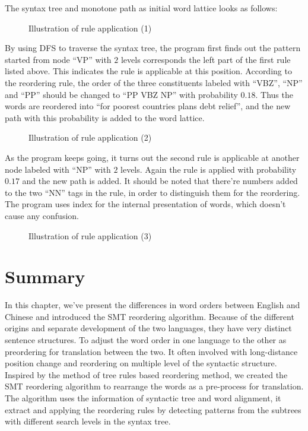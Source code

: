 The syntax tree and monotone path as initial word lattice looks as follows:
\begin{figure}[H]
\centering
\subfigure{

}
\subfigure{

}
\caption{Illustration of rule application (1)}
\end{figure}

By using DFS to traverse the syntax tree, the program first finds out the pattern started from node ``VP'' with $2$ levels corresponds the left part of the first rule listed above. This indicates the rule is applicable at this position. According to the reordering rule, the order of the three constituents labeled with ``VBZ'', ``NP'' and ``PP'' should be changed to ``PP VBZ NP'' with probability $0.18$. Thus the words are reordered into ``for poorest countries plans debt relief'', and the new path with this probability is added to the word lattice.

\begin{figure}[H]
\centering
\subfigure{

}
\subfigure{

}
\caption{Illustration of rule application (2)}
\end{figure}

As the program keeps going, it turns out the second rule is applicable at another node labeled with ``NP'' with $2$ levels. Again the rule is applied with probability $0.17$ and the new path is added. It should be noted that there're numbers added to the two ``NN'' tags in the rule, in order to distinguish them for the reordering. The program uses index for the internal presentation of words, which doesn't cause any confusion.

\begin{figure}[H]
\centering
\subfigure{

}
\subfigure{

}
\caption{Illustration of rule application (3)}
\end{figure}

\section{Summary}
In this chapter, we've present the differences in word orders between English and Chinese and introduced the SMT reordering algorithm. Because of the different origins and separate development of the two languages, they have very distinct sentence structures. To adjust the word order in one language to the other as preordering for translation between the two. It often involved with long-distance position change and reordering on multiple level of the syntactic structure. Inspired by the method of tree rules based reordering method, we created the SMT reordering algorithm to rearrange the words as a pre-process for translation. The algorithm uses the information of syntactic tree and word alignment, it extract and applying the reordering rules by detecting patterns from the subtrees with different search levels in the syntax tree.
